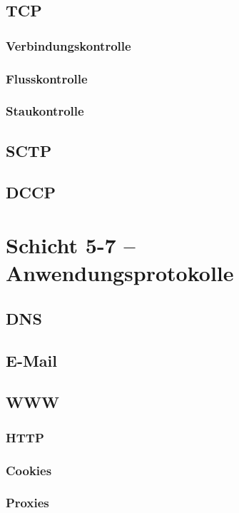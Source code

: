 \documentclass[a4paper,10pt]{scrartcl}
\begin{document}
\subsection{TCP}
\subsubsection{Verbindungskontrolle}
\subsubsection{Flusskontrolle}
\subsubsection{Staukontrolle}
\subsection{SCTP}
\subsection{DCCP}

\section{Schicht 5-7 -- Anwendungsprotokolle}
\subsection{DNS}
\subsection{E-Mail}
\subsection{WWW}
\subsubsection{HTTP}
\subsubsection{Cookies}
\subsubsection{Proxies}
\end{document}
